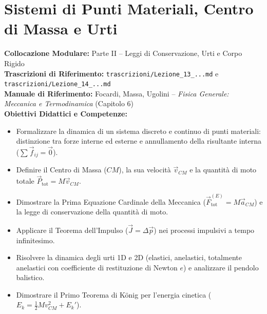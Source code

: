 \chapter{Sistemi di Punti Materiali, Centro di Massa e Urti}
\label{chap:sistemi_punti_urti}

\begin{tcolorbox}[enhanced, breakable, colback=navyblue!4!white, colframe=navyblue!80!black,
    coltitle=white, fonttitle=\bfseries\sffamily, title={Quadro Sinottico del Capitolo 06 (Corrispondenza: Lezioni 13 e 14)},
    sharp corners, rounded corners=south, boxrule=1pt]
\textbf{Collocazione Modulare:} Parte II -- Leggi di Conservazione, Urti e Corpo Rigido\\
\textbf{Trascrizioni di Riferimento:} \texttt{trascrizioni/Lezione\_13\_...md} e \texttt{trascrizioni/Lezione\_14\_...md}\\
\textbf{Manuale di Riferimento:} Focardi, Massa, Ugolini -- \emph{Fisica Generale: Meccanica e Termodinamica} (Capitolo 6)\\
\textbf{Obiettivi Didattici e Competenze:}\par
\begin{itemize}
    \item Formalizzare la dinamica di un sistema discreto e continuo di punti materiali: distinzione tra forze interne ed esterne e annullamento della risultante interna ($\sum \vec{f}_{ij} = \vec{0}$).
    \item Definire il Centro di Massa ($CM$), la sua velocità $\vec{v}_{CM}$ e la quantità di moto totale $\vec{P}_{\text{tot}} = M \vec{v}_{CM}$.
    \item Dimostrare la Prima Equazione Cardinale della Meccanica ($\vec{F}^{(E)}_{\text{tot}} = M \vec{a}_{CM}$) e la legge di conservazione della quantità di moto.
    \item Applicare il Teorema dell'Impulso ($\vec{J} = \Delta\vec{p}$) nei processi impulsivi a tempo infinitesimo.
    \item Risolvere la dinamica degli urti 1D e 2D (elastici, anelastici, totalmente anelastici con coefficiente di restituzione di Newton $e$) e analizzare il pendolo balistico.
    \item Dimostrare il Primo Teorema di König per l'energia cinetica ($E_k = \frac{1}{2}M v_{CM}^2 + E_k'$).
\end{itemize}
\end{tcolorbox}

